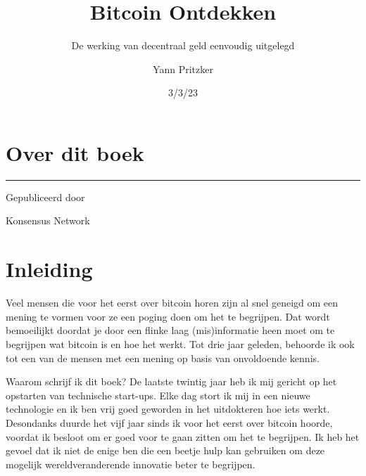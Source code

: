 \documentclass[
  letterpaper,
]{scrbook}
\title{Bitcoin Ontdekken}
\subtitle{De werking van decentraal geld eenvoudig uitgelegd}
\author{Yann Pritzker}
\date{3/3/23}
\renewcommand*\contentsname{Table of contents}
\newcommand\contentsname{Table of contents}
\begin{document}
\frontmatter
\maketitle
\ifdefined\Shaded\renewenvironment{Shaded}{\begin{tcolorbox}[borderline west={3pt}{0pt}{shadecolor}, enhanced, interior hidden, boxrule=0pt, frame hidden, breakable, sharp corners]}{\end{tcolorbox}}\fi

\renewcommand*\contentsname{Inhoudsopgave}
{
\hypersetup{linkcolor=}
\setcounter{tocdepth}{2}
\tableofcontents
}
\mainmatter
{}

\hypertarget{over-dit-boek}{%
\chapter*{Over dit boek}\label{over-dit-boek}}


\begin{center}\rule{0.5\linewidth}{0.5pt}\end{center}

Gepubliceerd door

Konsensus Network


\hypertarget{inleiding}{%
\chapter*{Inleiding}\label{inleiding}}


Veel mensen die voor het eerst over bitcoin horen zijn al snel geneigd
om een mening te vormen voor ze een poging doen om het te begrijpen. Dat
wordt bemoeilijkt doordat je door een flinke laag (mis)informatie heen
moet om te begrijpen wat bitcoin is en hoe het werkt. Tot drie jaar
geleden, behoorde ik ook tot een van de mensen met een mening op basis
van onvoldoende kennis.

Waarom schrijf ik dit boek? De laatste twintig jaar heb ik mij gericht
op het opstarten van technische start-ups. Elke dag stort ik mij in een
nieuwe technologie en ik ben vrij goed geworden in het uitdokteren hoe
iets werkt. Desondanks duurde het vijf jaar sinds ik voor het eerst over
bitcoin hoorde, voordat ik besloot om er goed voor te gaan zitten om het
te begrijpen. Ik heb het gevoel dat ik niet de enige ben die een beetje
hulp kan gebruiken om deze mogelijk wereldveranderende innovatie beter
te begrijpen.
\end{document}
